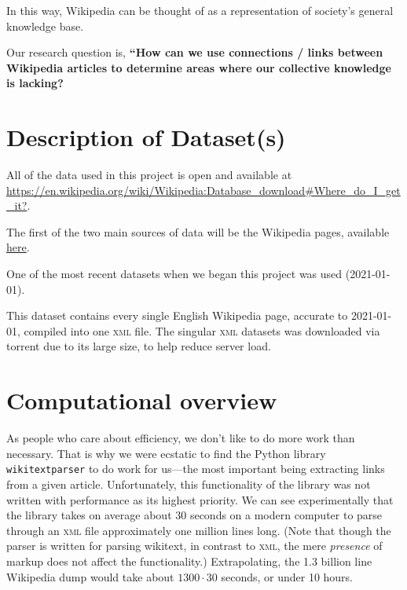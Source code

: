 \documentclass[fontsize=12pt]{article}
\newcommand{\py}[1]{\texttt{#1}}
\begin{document}
\begin{multicols}{2}
    In this way, Wikipedia can be thought of as a representation of society's general knowledge base.
    
    Our research question is, \textbf{``How can we use connections / links between Wikipedia articles to determine areas where our collective knowledge is lacking?}
    
    \section{Description of Dataset(s)}
    All of the data used in this project is open and available at \href{https://en.wikipedia.org/wiki/Wikipedia:Database\_download\#Where\_do\_I\_get\_it?}{https://en.wikipedia.org/wiki/Wikipedia:Database\_download\#Where\_do\_I\_get\_it?}. \parencite{WikimediaDownloads}
    
    The first of the two main sources of data will be the Wikipedia pages, available \href{https://meta.wikimedia.org/wiki/Data\_dump\_torrents\#English\_Wikipedia}{here}. \parencite{DataDumpTorrents}
    
    One of the most recent datasets when we began this project was used (2021-01-01).
    
    This dataset contains every single English Wikipedia page, accurate to 2021-01-01, compiled into one \textsc{xml} file. The singular \textsc{xml} datasets was downloaded via torrent due to its large size, to help reduce server load.
    
    \section{Computational overview}
    As people who care about efficiency, we don't like to do more work than necessary. That is why we were ecstatic to find the Python library \py{wikitextparser} to do work for us---the most important being extracting links from a given article. Unfortunately, this functionality of the library was not written with performance as its highest priority. We can see experimentally that the library takes on average about 30 seconds on a modern computer to parse through an \textsc{xml} file approximately one million lines long. (Note that though the parser is written for parsing wikitext, in contrast to \textsc{xml}, the mere \emph{presence} of markup does not affect the functionality.) Extrapolating, the 1.3 billion line Wikipedia dump would take about \(1300 \cdot 30\) seconds, or under 10 hours.
    

\end{multicols}
\end{document}
